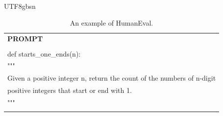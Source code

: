 \documentclass[11pt, a4paper, logo, copyright, nonumbering]{deepseek}
\begin{document}
\begin{CJK*}{UTF8}{gbsn}
\begin{table}[h]
    \centering \small
\begin{tabular}{p{12cm}}
\toprule
\textbf{PROMPT}\\
\\def starts\_one\_ends(n):
\\    """
\\    Given a positive integer n, return the count of the numbers of n-digit
\\    positive integers that start or end with 1.
\\    """
\\\\
\bottomrule
\end{tabular}
    \caption{\centering An example of HumanEval.}
    \label{tab:humaneval_eval_format_example}
\end{table}


\end{CJK*}
\end{document}
